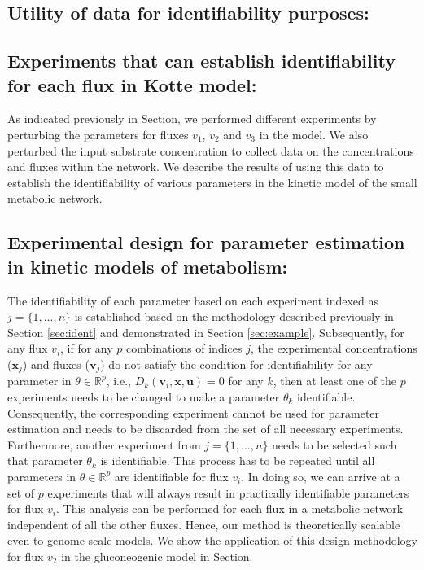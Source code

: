\documentclass[10pt]{article}
\begin{document}
\subsection{Utility of data for identifiability purposes:}

\subsection{Experiments that can establish identifiability for each flux in Kotte model:}	
As indicated previously in Section, we performed different experiments by perturbing the parameters for fluxes $v_1$, $v_2$ and $v_3$ in the model. We also perturbed the input substrate concentration to collect data on the concentrations and fluxes within the network. We describe the results of using this data to establish the identifiability of various parameters in the kinetic model of the small metabolic network.



\subsection{Experimental design for parameter estimation in kinetic models of metabolism:}
The identifiability of each parameter based on each experiment indexed as $j = \{1, ..., n\}$ is established based on the methodology described previously in Section \ref{sec:ident} and demonstrated in Section \ref{sec:example}. Subsequently, for any flux $v_i$, if for any $p$ combinations of indices $j$, the experimental concentrations ($\mathbf{x}_j$) and fluxes ($\mathbf{v}_j$) do not satisfy the condition for identifiability for any parameter in $\theta\in\mathbb{R}^p$, i.e., $D_k(\mathbf{v}_i, \mathbf{x}, \mathbf{u}) = 0$ for any $k$, then at least one of the $p$ experiments needs to be changed to make a parameter $\theta_k$ identifiable. Consequently, the corresponding experiment cannot be used for parameter estimation and needs to be discarded from the set of all necessary experiments. Furthermore, another experiment from $j = \{1, ..., n\}$ needs to be selected such that parameter $\theta_k$ is identifiable. This process has to be repeated until all parameters in $\theta\in\mathbb{R}^p$ are identifiable for flux $v_i$. In doing so, we can arrive at a set of $p$ experiments that will always result in practically identifiable parameters for flux $v_i$. This analysis can be performed for each flux in a metabolic network independent of all the other fluxes. Hence, our method is theoretically scalable even to genome-scale models. We show the application of this design methodology for flux $v_2$ in the gluconeogenic model in Section.
\end{document}
